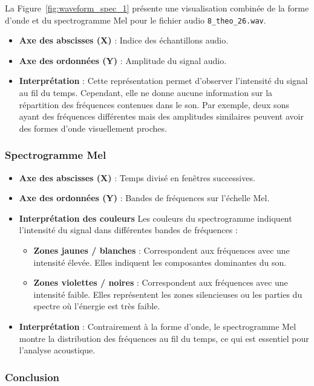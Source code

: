 \documentclass{article}
\begin{document}
La Figure~\ref{fig:waveform_spec_1} présente une visualisation combinée de la forme d’onde et du spectrogramme Mel pour le fichier audio \texttt{8\_theo\_26.wav}.

\begin{itemize}
    \item \textbf{Axe des abscisses (X)} : Indice des échantillons audio.
    \item \textbf{Axe des ordonnées (Y)} : Amplitude du signal audio.
    \item \textbf{Interprétation} : Cette représentation permet d'observer l'intensité du signal au fil du temps. Cependant, elle ne donne aucune information sur la répartition des fréquences contenues dans le son. Par exemple, deux sons ayant des fréquences différentes mais des amplitudes similaires peuvent avoir des formes d’onde visuellement proches.
\end{itemize}

\subsubsection{Spectrogramme Mel}
\begin{itemize}
    \item \textbf{Axe des abscisses (X)} : Temps divisé en fenêtres successives.
    \item \textbf{Axe des ordonnées (Y)} : Bandes de fréquences sur l’échelle Mel.
    \item \textbf{Interprétation des couleurs}
    Les couleurs du spectrogramme indiquent l'intensité du signal dans différentes bandes de fréquences :
    \begin{itemize}
        \item \textbf{Zones jaunes / blanches} : Correspondent aux fréquences avec une intensité élevée. Elles indiquent les composantes dominantes du son.
        \item \textbf{Zones violettes / noires} : Correspondent aux fréquences avec une intensité faible. Elles représentent les zones silencieuses ou les parties du spectre où l’énergie est très faible.
    \end{itemize}
    \item \textbf{Interprétation} : Contrairement à la forme d’onde, le spectrogramme Mel montre la distribution des fréquences au fil du temps, ce qui est essentiel pour l’analyse acoustique.
\end{itemize}

\subsubsection{Conclusion}
\end{document}
